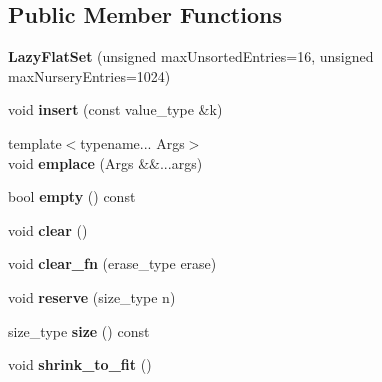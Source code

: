 \subsection*{Public Member Functions}
\begin{DoxyCompactItemize}
\item 
\hypertarget{classrs_1_1_lazy_flat_set_a9ea0bbd4e1d94533137a9b56ccac7d4c}{{\bfseries Lazy\+Flat\+Set} (unsigned max\+Unsorted\+Entries=16, unsigned max\+Nursery\+Entries=1024)}\label{classrs_1_1_lazy_flat_set_a9ea0bbd4e1d94533137a9b56ccac7d4c}

\item 
\hypertarget{classrs_1_1_lazy_flat_set_a4d054f28cda0cc8f121f744ef51ff522}{void {\bfseries insert} (const value\+\_\+type \&k)}\label{classrs_1_1_lazy_flat_set_a4d054f28cda0cc8f121f744ef51ff522}

\item 
\hypertarget{classrs_1_1_lazy_flat_set_af0a6a89258598652bd3427dd30f305d7}{{\footnotesize template$<$typename... Args$>$ }\\void {\bfseries emplace} (Args \&\&...args)}\label{classrs_1_1_lazy_flat_set_af0a6a89258598652bd3427dd30f305d7}

\item 
\hypertarget{classrs_1_1_lazy_flat_set_a48f842cd25a139242cd765727c710d74}{bool {\bfseries empty} () const }\label{classrs_1_1_lazy_flat_set_a48f842cd25a139242cd765727c710d74}

\item 
\hypertarget{classrs_1_1_lazy_flat_set_aff614815c0687575e57c2ceb7d8ea404}{void {\bfseries clear} ()}\label{classrs_1_1_lazy_flat_set_aff614815c0687575e57c2ceb7d8ea404}

\item 
\hypertarget{classrs_1_1_lazy_flat_set_a41a13387ae1d139cc272a72ab5cf9a6d}{void {\bfseries clear\+\_\+fn} (erase\+\_\+type erase)}\label{classrs_1_1_lazy_flat_set_a41a13387ae1d139cc272a72ab5cf9a6d}

\item 
\hypertarget{classrs_1_1_lazy_flat_set_a5520dcf84139948db4a0ac404aa46b5d}{void {\bfseries reserve} (size\+\_\+type n)}\label{classrs_1_1_lazy_flat_set_a5520dcf84139948db4a0ac404aa46b5d}

\item 
\hypertarget{classrs_1_1_lazy_flat_set_a87442717551e748854bc2579630fc929}{size\+\_\+type {\bfseries size} () const }\label{classrs_1_1_lazy_flat_set_a87442717551e748854bc2579630fc929}

\item 
\hypertarget{classrs_1_1_lazy_flat_set_abd6bf510bda52919c5cbaaa3f100315b}{void {\bfseries shrink\+\_\+to\+\_\+fit} ()}\label{classrs_1_1_lazy_flat_set_abd6bf510bda52919c5cbaaa3f100315b}


\end{DoxyCompactItemize}
